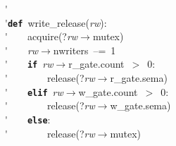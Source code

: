\'\>\\

\'\>\texttt{\textbf{def}}~write\_release(\textit{rw}):\\

\'\>~~~~acquire(?\textit{rw}$\rightarrow$mutex)\\

\'\>~~~~\textit{rw}$\rightarrow$nwriters~--=~1\\

\'\>~~~~\texttt{\textbf{if}}~\textit{rw}$\rightarrow$r\_gate.count~$>$~0:\\

\'\>~~~~~~~~release(?\textit{rw}$\rightarrow$r\_gate.sema)\\

\'\>~~~~\texttt{\textbf{elif}}~\textit{rw}$\rightarrow$w\_gate.count~$>$~0:\\

\'\>~~~~~~~~release(?\textit{rw}$\rightarrow$w\_gate.sema)\\

\'\>~~~~\texttt{\textbf{else}}:\\

\'\>~~~~~~~~release(?\textit{rw}$\rightarrow$mutex)